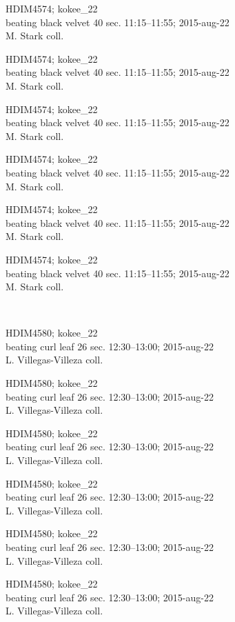 \documentclass[2pt]{extarticle}
\begin{document}
\noindent
\parbox{0.16\textwidth}{\tiny \raggedright \rule[-0.3\baselineskip]{0pt}{10pt}HDIM4574; kokee\_22\\ beating black velvet 40 sec. 11:15--11:55; 2015-aug-22\\ M. Stark coll.}
\parbox{0.16\textwidth}{\tiny \raggedright \rule[-0.3\baselineskip]{0pt}{10pt}HDIM4574; kokee\_22\\ beating black velvet 40 sec. 11:15--11:55; 2015-aug-22\\ M. Stark coll.}
\parbox{0.16\textwidth}{\tiny \raggedright \rule[-0.3\baselineskip]{0pt}{10pt}HDIM4574; kokee\_22\\ beating black velvet 40 sec. 11:15--11:55; 2015-aug-22\\ M. Stark coll.}
\parbox{0.16\textwidth}{\tiny \raggedright \rule[-0.3\baselineskip]{0pt}{10pt}HDIM4574; kokee\_22\\ beating black velvet 40 sec. 11:15--11:55; 2015-aug-22\\ M. Stark coll.}
\parbox{0.16\textwidth}{\tiny \raggedright \rule[-0.3\baselineskip]{0pt}{10pt}HDIM4574; kokee\_22\\ beating black velvet 40 sec. 11:15--11:55; 2015-aug-22\\ M. Stark coll.}
\parbox{0.16\textwidth}{\tiny \raggedright \rule[-0.3\baselineskip]{0pt}{10pt}HDIM4574; kokee\_22\\ beating black velvet 40 sec. 11:15--11:55; 2015-aug-22\\ M. Stark coll.} \\ 
\vspace{0.001in} 

\noindent
\parbox{0.16\textwidth}{\tiny \raggedright \rule[-0.3\baselineskip]{0pt}{10pt}HDIM4580; kokee\_22\\ beating curl leaf 26 sec. 12:30--13:00; 2015-aug-22\\ L. Villegas-Villeza coll.}
\parbox{0.16\textwidth}{\tiny \raggedright \rule[-0.3\baselineskip]{0pt}{10pt}HDIM4580; kokee\_22\\ beating curl leaf 26 sec. 12:30--13:00; 2015-aug-22\\ L. Villegas-Villeza coll.}
\parbox{0.16\textwidth}{\tiny \raggedright \rule[-0.3\baselineskip]{0pt}{10pt}HDIM4580; kokee\_22\\ beating curl leaf 26 sec. 12:30--13:00; 2015-aug-22\\ L. Villegas-Villeza coll.}
\parbox{0.16\textwidth}{\tiny \raggedright \rule[-0.3\baselineskip]{0pt}{10pt}HDIM4580; kokee\_22\\ beating curl leaf 26 sec. 12:30--13:00; 2015-aug-22\\ L. Villegas-Villeza coll.}
\parbox{0.16\textwidth}{\tiny \raggedright \rule[-0.3\baselineskip]{0pt}{10pt}HDIM4580; kokee\_22\\ beating curl leaf 26 sec. 12:30--13:00; 2015-aug-22\\ L. Villegas-Villeza coll.}
\parbox{0.16\textwidth}{\tiny \raggedright \rule[-0.3\baselineskip]{0pt}{10pt}HDIM4580; kokee\_22\\ beating curl leaf 26 sec. 12:30--13:00; 2015-aug-22\\ L. Villegas-Villeza coll.} \\ 
\vspace{0.001in} 
\end{document}
